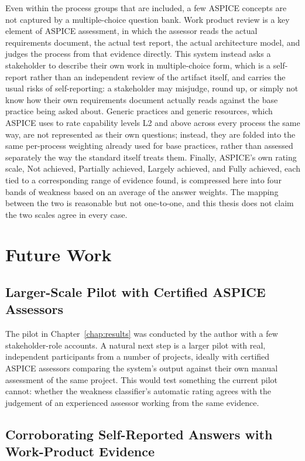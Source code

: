 \documentclass[a4paper, 12pt, oneside, openany, BCOR1cm,toc=chapterentrywithdots]{scrbook}
\begin{document}
Even within the process groups that are included, a few ASPICE concepts are not captured by a
multiple-choice question bank. Work product review is a key element of ASPICE assessment, in
which the assessor reads the actual requirements document, the actual test report, the actual
architecture model, and judges the process from that evidence directly. This system instead
asks a stakeholder to describe their own work in multiple-choice form, which is a self-report
rather than an independent review of the artifact itself, and carries the usual risks of
self-reporting: a stakeholder may misjudge, round up, or simply not know how their own
requirements document actually reads against the base practice being asked about. Generic
practices and generic resources, which ASPICE uses to rate capability levels L2 and above across
every process the same way, are not represented as their own questions; instead, they are folded
into the same per-process weighting already used for base practices, rather than assessed
separately the way the standard itself treats them. Finally, ASPICE's own rating scale, Not
achieved, Partially achieved, Largely achieved, and Fully achieved, each tied to a corresponding
range of evidence found, is compressed here into four bands of weakness based on an average of
the answer weights. The mapping between the two is reasonable but not one-to-one, and this
thesis does not claim the two scales agree in every case.

\section{Future Work}
\subsection{Larger-Scale Pilot with Certified ASPICE Assessors}

The pilot in Chapter~\ref{chap:results} was conducted by the author with a few stakeholder-role
accounts. A natural next step is a larger pilot with real, independent participants from a
number of projects, ideally with certified ASPICE assessors comparing the system's output
against their own manual assessment of the same project. This would test something the current
pilot cannot: whether the weakness classifier's automatic rating agrees with the judgement of an
experienced assessor working from the same evidence.

\subsection{Corroborating Self-Reported Answers with Work-Product Evidence}
\end{document}
